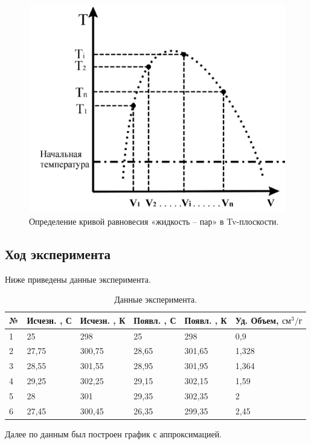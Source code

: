 \documentclass[a4paper,14pt]{article}
\begin{document}
\begin{figure}[h]
    \centering
    \includegraphics[scale=0.8]{TV.png}
    \caption{Определение кривой равновесия
«жидкость – пар» в Tv-плоскости.}
\end{figure}


\subsection{Ход эксперимента}

Ниже приведены данные эксперимента.


\begin{table}[!ht]
    \centering
    \begin{tabular}{|l|l|l|l|l|l|}
    \hline
        № & Исчезн. , С & Исчезн. , К & Появл. , С & Появл. , К & Уд. Объем, $см^3/г$ \\ \hline
        1 & 25 & 298 & 25 & 298 & 0,9 \\ \hline
        2 & 27,75 & 300,75 & 28,65 & 301,65 & 1,328 \\ \hline
        3 & 28,55 & 301,55 & 28,95 & 301,95 & 1,364 \\ \hline
        4 & 29,25 & 302,25 & 29,15 & 302,15 & 1,59 \\ \hline
        5 & 28 & 301 & 29,35 & 302,35 & 2 \\ \hline
        6 & 27,45 & 300,45 & 26,35 & 299,35 & 2,45 \\ \hline
    \end{tabular}
    \caption{Данные эксперимента.}
\end{table}
\clearpage
Далее по данным был построен график с аппроксимацией.
\end{document}
